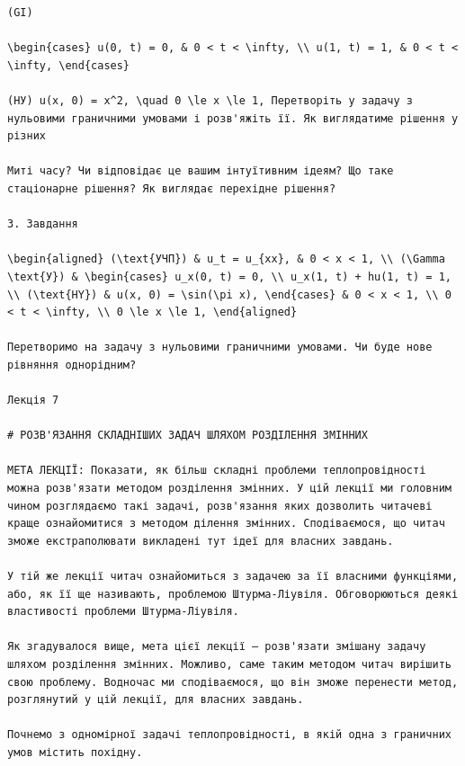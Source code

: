 \documentclass[
  ukrainian,
]{article}
\begin{document}
\begin{verbatim}
(GI)

\begin{cases} u(0, t) = 0, & 0 < t < \infty, \\ u(1, t) = 1, & 0 < t < \infty, \end{cases}

(НУ) u(x, 0) = x^2, \quad 0 \le x \le 1, Перетворіть у задачу з нульовими граничними умовами і розв'яжіть її. Як виглядатиме рішення у різних

Миті часу? Чи відповідає це вашим інтуїтивним ідеям? Що таке стаціонарне рішення? Як виглядає перехідне рішення?

3. Завдання

\begin{aligned} (\text{УЧП}) & u_t = u_{xx}, & 0 < x < 1, \\ (\Gamma \text{У}) & \begin{cases} u_x(0, t) = 0, \\ u_x(1, t) + hu(1, t) = 1, \\ (\text{HY}) & u(x, 0) = \sin(\pi x), \end{cases} & 0 < x < 1, \\ 0 < t < \infty, \\ 0 \le x \le 1, \end{aligned}

Перетворимо на задачу з нульовими граничними умовами. Чи буде нове рівняння однорідним?

Лекція 7

# РОЗВ'ЯЗАННЯ СКЛАДНІШИХ ЗАДАЧ ШЛЯХОМ РОЗДІЛЕННЯ ЗМІННИХ

МЕТА ЛЕКЦІЇ: Показати, як більш складні проблеми теплопровідності можна розв'язати методом розділення змінних. У цій лекції ми головним чином розглядаємо такі задачі, розв'язання яких дозволить читачеві краще ознайомитися з методом ділення змінних. Сподіваємося, що читач зможе екстраполювати викладені тут ідеї для власних завдань.

У тій же лекції читач ознайомиться з задачею за її власними функціями, або, як її ще називають, проблемою Штурма-Ліувіля. Обговорюються деякі властивості проблеми Штурма-Ліувіля.

Як згадувалося вище, мета цієї лекції — розв'язати змішану задачу шляхом розділення змінних. Можливо, саме таким методом читач вирішить свою проблему. Водночас ми сподіваємося, що він зможе перенести метод, розглянутий у цій лекції, для власних завдань.

Почнемо з одномірної задачі теплопровідності, в якій одна з граничних умов містить похідну.


\end{verbatim}
\end{document}
